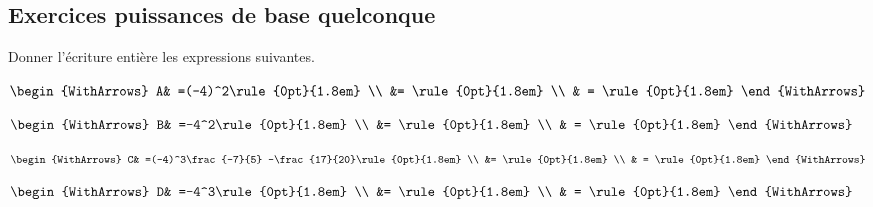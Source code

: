 \documentclass[main.tex]{subfiles}
\begin{document}
\subsection{Exercices puissances de base quelconque}
\begin{example} Donner l'écriture entière les expressions suivantes.
	
	\noindent\hfill\parbox{0.22\linewidth}{	
		$\begin{WithArrows}
			A& =(-4)^2\rule{0pt}{1.8em}  \\
			&= \rule{0pt}{1.8em}  \\
			& =  \rule{0pt}{1.8em}  
		\end{WithArrows}$ 	
	} \hfill\parbox{0.22\linewidth}{	
		$\begin{WithArrows}
			B& =-4^2\rule{0pt}{1.8em} \\
			&= \rule{0pt}{1.8em} \\
			& = \rule{0pt}{1.8em}    
		\end{WithArrows}$ 	
	}  \hfill\parbox{0.22\linewidth}{	
		$\begin{WithArrows}
			C& =(-4)^3\frac{-7}{5} -\frac{17}{20}\rule{0pt}{1.8em} \\
			&= \rule{0pt}{1.8em} \\
			& = \rule{0pt}{1.8em}   
		\end{WithArrows}$
	}  \hfill\parbox{0.22\linewidth}{	
		$\begin{WithArrows}
			D& =-4^3\rule{0pt}{1.8em} \\
			&= \rule{0pt}{1.8em} \\
			& = \rule{0pt}{1.8em}    
		\end{WithArrows}$
	}  
\end{example}
\end{document}
